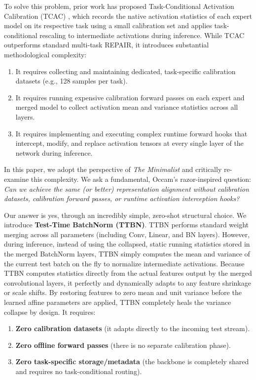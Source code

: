 \documentclass{article}
\theoremstyle{plain}
\theoremstyle{definition}
\theoremstyle{remark}
\begin{document}
To solve this problem, prior work has proposed Task-Conditional Activation Calibration (TCAC) \cite{anonymous_tcac}, which records the native activation statistics of each expert model on its respective task using a small calibration set and applies task-conditional rescaling to intermediate activations during inference. While TCAC outperforms standard multi-task REPAIR, it introduces substantial methodological complexity:
\begin{enumerate}
    \item It requires collecting and maintaining dedicated, task-specific calibration datasets (e.g., 128 samples per task).
    \item It requires running expensive calibration forward passes on each expert and merged model to collect activation mean and variance statistics across all layers.
    \item It requires implementing and executing complex runtime forward hooks that intercept, modify, and replace activation tensors at every single layer of the network during inference.
\end{enumerate}

In this paper, we adopt the perspective of \textit{The Minimalist} and critically re-examine this complexity. We ask a fundamental, Occam's razor-inspired question: \textit{Can we achieve the same (or better) representation alignment without calibration datasets, calibration forward passes, or runtime activation interception hooks?}

Our answer is yes, through an incredibly simple, zero-shot structural choice. We introduce \textbf{Test-Time BatchNorm (TTBN)}. TTBN performs standard weight merging across all parameters (including Conv, Linear, and BN layers). However, during inference, instead of using the collapsed, static running statistics stored in the merged BatchNorm layers, TTBN simply computes the mean and variance of the current test batch on the fly to normalize intermediate activations. Because TTBN computes statistics directly from the actual features output by the merged convolutional layers, it perfectly and dynamically adapts to any feature shrinkage or scale shifts. By restoring features to zero mean and unit variance before the learned affine parameters are applied, TTBN completely heals the variance collapse by design. It requires:
\begin{enumerate}
    \item \textbf{Zero calibration datasets} (it adapts directly to the incoming test stream).
    \item \textbf{Zero offline forward passes} (there is no separate calibration phase).
    \item \textbf{Zero task-specific storage/metadata} (the backbone is completely shared and requires no task-conditional routing).
\end{enumerate}
\end{document}
